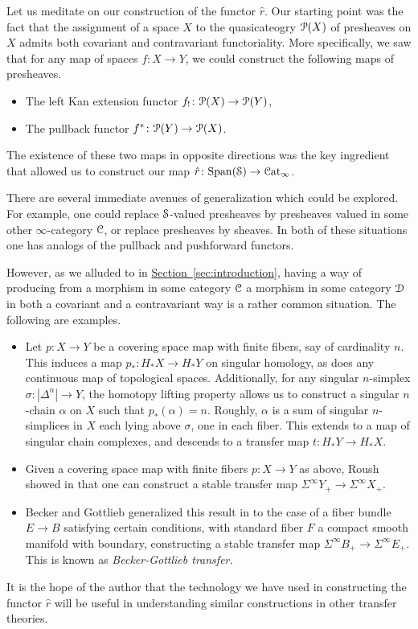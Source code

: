 \documentclass[main.tex]{subfiles}
\begin{document}
Let us meditate on our construction of the functor $\hat{r}$. Our starting point was the fact that the assignment of a space $X$ to the quasicateogry $\P(X)$ of presheaves on $X$ admits both covariant and contravariant functoriality. More specifically, we saw that for any map of spaces $f\colon X \to Y$, we could construct the following maps of presheaves.
\begin{itemize}
  \item The left Kan extension functor $f_{!}\colon \P(X) \to \P(Y)$,

  \item The pullback functor $f^{*}\colon \P(Y) \to \P(X)$.
\end{itemize}
The existence of these two maps in opposite directions was the key ingredient that allowed us to construct our map $\hat{r}\colon \Span(\S) \to \ICat$.

There are several immediate avenues of generalization which could be explored. For example, one could replace $\S$-valued presheaves by presheaves valued in some other $\infty$-category $\category{C}$, or replace presheaves by sheaves. In both of these situations one has analogs of the pullback and pushforward functors.

However, as we alluded to in \hyperref[sec:introduction]{Section~\ref*{sec:introduction}}, having a way of producing from a morphism in some category $\category{C}$ a morphism in some category $\category{D}$ in both a covariant and a contravariant way is a rather common situation. The following are examples.

\begin{itemize}
  \item Let $p\colon X \to Y$ be a covering space map with finite fibers, say of cardinality $n$. This induces a map $p_{*}\colon H_{*}X \to H_{*}Y$ on singular homology, as does any continuous map of topological spaces. Additionally, for any singular $n$-simplex $\sigma\colon |\Delta^{n}| \to Y$, the homotopy lifting property allows us to construct a singular $n$-chain $\alpha$ on $X$ such that $p_{*}(\alpha) = n$. Roughly, $\alpha$ is a sum of singular $n$-simplices in $X$ each lying above $\sigma$, one in each fiber. This extends to a map of singular chain complexes, and descends to a transfer map $t\colon H_{*}Y \to H_{*}X$.

  \item Given a covering space map with finite fibers $p\colon X \to Y$ as above, Roush showed in \cite{roushtransfer} that one can construct a stable transfer map $\Sigma^{\infty} Y_{+} \to \Sigma^{\infty} X_{+}$.

  \item Becker and Gottlieb generalized this result in \cite{beckergottlieb} to the case of a fiber bundle $E \to B$ satisfying certain conditions, with standard fiber $F$ a compact smooth manifold with boundary, constructing a stable transfer map $\Sigma^{\infty}B_{+} \to \Sigma^{\infty}E_{+}$. This is known as \emph{Becker-Gottlieb transfer.}
\end{itemize}

It is the hope of the author that the technology we have used in constructing the functor $\hat{r}$ will be useful in understanding similar constructions in other transfer theories.
\end{document}
